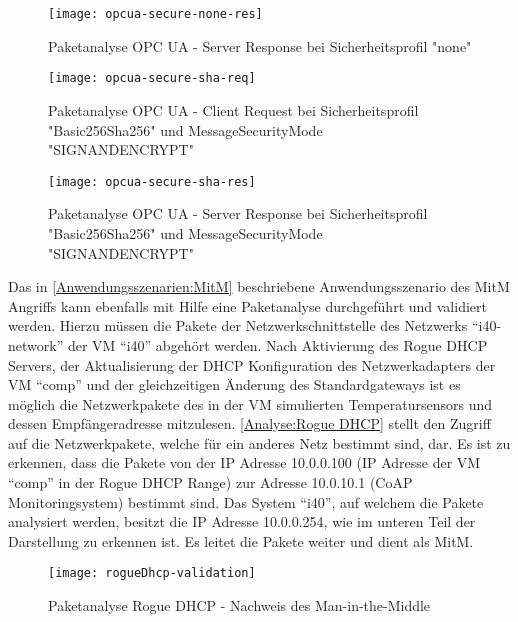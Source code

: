 \begin{figure}[h]
  \centering
  \texttt{[image: opcua-secure-none-res]}
  \caption{Paketanalyse OPC UA - Server Response bei Sicherheitsprofil "none"} 
  \label{Analyse:opcua-secure-none-res}
\end{figure}

\begin{figure}[h]
  \centering
  \texttt{[image: opcua-secure-sha-req]}
  \caption{Paketanalyse OPC UA - Client Request bei Sicherheitsprofil "Basic256Sha256" und MessageSecurityMode "SIGNANDENCRYPT"} 
  \label{Analyse:opcua-secure-sha-req}
\end{figure}

\begin{figure}[h]
  \centering
  \texttt{[image: opcua-secure-sha-res]}
  \caption{Paketanalyse OPC UA - Server Response bei Sicherheitsprofil "Basic256Sha256" und MessageSecurityMode "SIGNANDENCRYPT"} 
  \label{Analyse:opcua-secure-sha-res}
\end{figure}

Das in \autoref{Anwendungsszenarien:MitM} beschriebene Anwendungsszenario des \ac{MitM} Angriffs kann ebenfalls mit Hilfe eine Paketanalyse durchgeführt und validiert werden. Hierzu müssen die Pakete der Netzwerkschnittstelle des Netzwerks "`i40-network"' der \ac{VM} "`i40"' abgehört werden. Nach Aktivierung des Rogue \ac{DHCP} Servers, der Aktualisierung der \ac{DHCP} Konfiguration des Netzwerkadapters der \ac{VM} "`comp"' und der gleichzeitigen Änderung des Standardgateways ist es möglich die Netzwerkpakete des in der \ac{VM} simulierten Temperatursensors und dessen Empfängeradresse mitzulesen. \autoref{Analyse:Rogue DHCP} stellt den Zugriff auf die Netzwerkpakete, welche für ein anderes Netz bestimmt sind, dar. Es ist zu erkennen, dass die Pakete von der \ac{IP} Adresse 10.0.0.100 (\ac{IP} Adresse der \ac{VM} "`comp"' in der Rogue \ac{DHCP} Range) zur Adresse 10.0.10.1 (\ac{CoAP} Monitoringsystem) bestimmt sind. Das System "`i40"', auf welchem die Pakete analysiert werden, besitzt die \ac{IP} Adresse 10.0.0.254, wie im unteren Teil der Darstellung zu erkennen ist. Es leitet die Pakete weiter und dient als \ac{MitM}.

\begin{figure}[h]
  \centering
  \texttt{[image: rogueDhcp-validation]}
  \caption{Paketanalyse Rogue DHCP - Nachweis des Man-in-the-Middle} 
  \label{Analyse:Rogue DHCP}
\end{figure}

